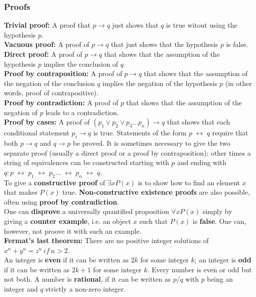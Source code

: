 \documentclass[12pt]{article}
\renewcommand{\iff}{\;\leftrightarrow\;}
\begin{document}
\subsubsection{Proofs} 
\bigskip
\textbf{Trivial proof:} A proof that $p \rightarrow q$ just shows that $q$ is true witout using the hypothesis $p$. \\
\textbf{Vacuous proof:} A proof of $p \rightarrow q$ that just shows that the hypothesis $p$ is false. \\
\textbf{Direct proof:} A proof of $p \rightarrow q$ that shows that the assumption of the hypothesis $p$ implies the conclusion of $q$. \\
\textbf{Proof by contraposition:} A proof of $p \rightarrow q$ that shows that the assumption of the negation of the conclusion $q$ implies the negation of the hypothesis $p$ (in other words, proof of contrapositive).\\
\textbf{Proof by contradiction:} A proof of $p$ that shows that the assumption of the negation of $p$ leads to a contradiction. \\
\textbf{Proof by cases:} A proof of $(p_1 \vee p_2 \vee p_3 ... p_n) \rightarrow q$ that shows that each conditional statement $p_i \rightarrow q$ is true. Statements of the form $p \iff q$ require that both $p \rightarrow q$ and $q \rightarrow p$ be proved. It is sometimes necessary to give the two separate proof (usually a direct proof or a proof by contraposition); other times a string of equivalences can be constructed starting with $p$ and ending with $q : p \iff p_1 \iff p_2 ... \iff p_n \iff q$. \\
To give a \textbf{constructive proof} of $\exists x P(x)$ is to show how to find an element $x$ that makes $P(x)$ true. \textbf{Non-constructive existence proofs} are also possible, often using \textbf{proof by contradiction}. \\
One can \textbf{disprove} a universally quantified proposition $\forall x P(x)$ simply by giving a \textbf{counter example}, i.e. an object $x$ such that $P(x)$ is \textbf{false}. One can, however, not proove it with such an example. \\
\medskip
\textbf{Fermat's last theorem:} There are no positive integer solutions of $x^n + y^n = z^n\ if\ n > 2$. \\
An integer is \textbf{even} if it can be written as $2k$ for some integer $k$; an integer is \textbf{odd} if it can be written as $2k + 1$ for some integer $k$. Every number is even or odd but not both. A number is \textbf{rational}, if it can be written as $p/q$ with $p$ being an integer and $q$ strictly a non-zero integer. \\
\newpage
\end{document}
